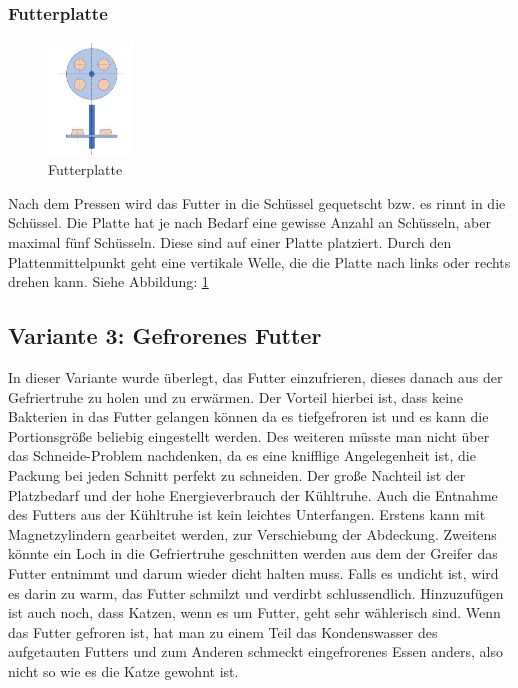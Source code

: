 \subsubsection{Futterplatte}

\begin{figure}
\vspace{-30pt}
  \begin{center}
    \includegraphics[width=0.20\textwidth]{Bilder/Powerpoint/Futterplatte}
  \end{center}
  \caption{Futterplatte}
  \label{Futterplatte}
  \vspace{-20pt}
\end{figure}


Nach dem Pressen wird das Futter in die Schüssel gequetscht bzw. es rinnt in die Schüssel. Die Platte hat je nach Bedarf eine gewisse Anzahl an Schüsseln, aber maximal fünf Schüsseln. Diese sind auf einer Platte platziert. Durch den Plattenmittelpunkt geht eine vertikale Welle, die die Platte nach links oder rechts drehen kann. Siehe Abbildung: \ref{Futterplatte} \\


\subsection{Variante 3: Gefrorenes Futter}

In dieser Variante wurde überlegt, das Futter einzufrieren, dieses danach aus der Gefriertruhe zu holen und zu erwärmen. Der Vorteil hierbei ist, dass keine Bakterien in das Futter gelangen können da es tiefgefroren ist und es kann die Portionsgröße beliebig eingestellt werden. Des weiteren müsste man nicht über das Schneide-Problem nachdenken, da es eine knifflige Angelegenheit ist, die Packung bei jeden Schnitt perfekt zu schneiden. Der große Nachteil ist der Platzbedarf und der hohe Energieverbrauch der Kühltruhe. Auch die Entnahme des Futters aus der Kühltruhe ist kein leichtes Unterfangen. Erstens kann mit Magnetzylindern gearbeitet werden, zur Verschiebung der Abdeckung. Zweitens könnte ein Loch in die Gefriertruhe geschnitten werden aus dem der Greifer das Futter entnimmt und darum wieder dicht halten muss. Falls es undicht ist, wird es darin zu warm, das Futter schmilzt und verdirbt schlussendlich. Hinzuzufügen ist auch noch, dass Katzen, wenn es um Futter, geht sehr wählerisch sind. Wenn das Futter gefroren ist, hat man zu einem  Teil das Kondenswasser des aufgetauten Futters und zum Anderen schmeckt eingefrorenes Essen anders, also nicht so wie es die Katze gewohnt ist.

